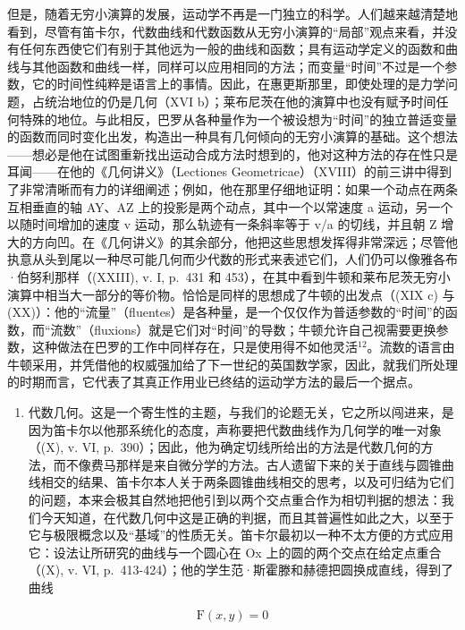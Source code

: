但是，随着无穷小演算的发展，运动学不再是一门独立的科学。人们越来越清楚地看到，尽管有笛卡尔，代数曲线和代数函数从无穷小演算的“局部”观点来看，并没有任何东西使它们有别于其他远为一般的曲线和函数；具有运动学定义的函数和曲线与其他函数和曲线一样，同样可以应用相同的方法；而变量“时间”不过是一个参数，它的时间性纯粹是语言上的事情。因此，在惠更斯那里，即使处理的是力学问题，占统治地位的仍是几何（XVI b）；莱布尼茨在他的演算中也没有赋予时间任何特殊的地位。与此相反，巴罗从各种量作为一个被设想为“时间”的独立普适变量的函数而同时变化出发，构造出一种具有几何倾向的无穷小演算的基础。这个想法——想必是他在试图重新找出运动合成方法时想到的，他对这种方法的存在性只是耳闻——在他的《几何讲义》（Lectiones Geometricae）（XVIII）的前三讲中得到了非常清晰而有力的详细阐述；例如，他在那里仔细地证明：如果一个动点在两条互相垂直的轴 AY、AZ 上的投影是两个动点，其中一个以常速度 a 运动，另一个以随时间增加的速度 v 运动，那么轨迹有一条斜率等于 v/a 的切线，并且朝 Z 增大的方向凹。在《几何讲义》的其余部分，他把这些思想发挥得非常深远；尽管他执意从头到尾以一种尽可能几何而少代数的形式来表述它们，人们仍可以像雅各布·伯努利那样（(XXIII), v. I, p.~431 和 453），在其中看到牛顿和莱布尼茨无穷小演算中相当大一部分的等价物。恰恰是同样的思想成了牛顿的出发点（(XIX c) 与 (XX)）：他的“流量”（fluentes）是各种量，是一个仅仅作为普适参数的“时间”的函数，而“流数”（fluxions）就是它们对“时间”的导数；牛顿允许自己视需要更换参数，这种做法在巴罗的工作中同样存在，只是使用得不如他灵活\(^{12}\)。流数的语言由牛顿采用，并凭借他的权威强加给了下一世纪的英国数学家，因此，就我们所处理的时期而言，它代表了其真正作用业已终结的运动学方法的最后一个据点。

\begin{enumerate}
\def\labelenumi{\Alph{enumi})}
\setcounter{enumi}{2}
\tightlist
\item
  代数几何。这是一个寄生性的主题，与我们的论题无关，它之所以闯进来，是因为笛卡尔以他那系统化的态度，声称要把代数曲线作为几何学的唯一对象（(X), v. VI, p.~390）；因此，他为确定切线所给出的方法是代数几何的方法，而不像费马那样是来自微分学的方法。古人遗留下来的关于直线与圆锥曲线相交的结果、笛卡尔本人关于两条圆锥曲线相交的思考，以及可归结为它们的问题，本来会极其自然地把他引到以两个交点重合作为相切判据的想法：我们今天知道，在代数几何中这是正确的判据，而且其普遍性如此之大，以至于它与极限概念以及“基域”的性质无关。笛卡尔最初以一种不太方便的方式应用它：设法让所研究的曲线与一个圆心在 Ox 上的圆的两个交点在给定点重合（(X), v. VI, p.~413-424）；他的学生范·斯霍滕和赫德把圆换成直线，得到了曲线
\end{enumerate}

\[
\mathrm{F} (x, y) = 0
\]

